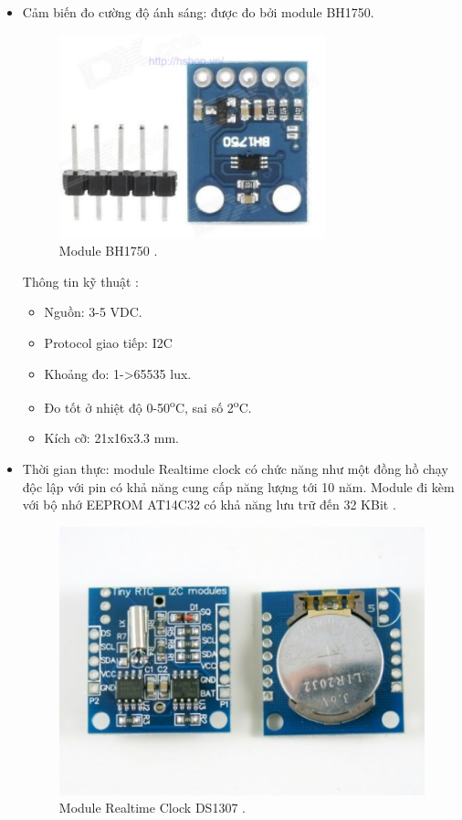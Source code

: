 \documentclass[a4paper,12pt,oneside]{article}
\begin{document}
\begin{itemize}
\item Cảm biến đo cường độ ánh sáng: được đo bởi module BH1750.
\begin{figure}[H]
	\centering
	\includegraphics[scale=.8]{hinh/BH175.png}
	\caption{Module BH1750 \cite{bh1750}.}
	\label{fig:BH175}
\end{figure}

\noindent Thông tin kỹ thuật \cite{bh1750}:
\begin{itemize}
\item Nguồn: 3-5 VDC.
\item Protocol giao tiếp: I2C
\item Khoảng đo: 1->65535 lux.
\item Đo tốt ở nhiệt độ 0-50\textsuperscript{o}C, sai số 2\textsuperscript{o}C.
\item Kích cỡ: 21x16x3.3 mm.
\end{itemize}

\item Thời gian thực: module Realtime clock có chức năng như một đồng hồ chạy độc lập với pin có khả năng cung cấp năng lượng tới 10 năm. Module đi kèm với bộ nhớ EEPROM AT14C32 có khả năng lưu trữ đến 32 KBit \cite{ds1307}.
\begin{figure}[H]
	\centering
	\includegraphics[scale=.4]{hinh/DS1307.PNG}
	\caption{Module Realtime Clock DS1307 \cite{ds1307}.}
	\label{fig:DS1307}
\end{figure}



\end{itemize}
\end{document}
